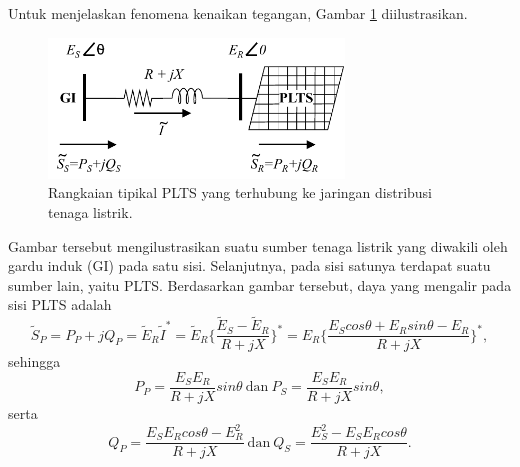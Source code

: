 {Untuk menjelaskan fenomena kenaikan tegangan, Gambar \ref{volrise} diilustrasikan. 
\begin{figure}[!h]
	\centering
	\includegraphics[width=0.7\textwidth]{Fig/volrise.pdf}
	\caption{Rangkaian tipikal PLTS yang terhubung ke jaringan distribusi tenaga listrik.}
	\label{volrise}
\end{figure}
Gambar tersebut mengilustrasikan suatu sumber tenaga listrik yang diwakili oleh gardu induk (GI) pada satu sisi. Selanjutnya, pada sisi satunya terdapat suatu sumber lain, yaitu PLTS. Berdasarkan gambar tersebut, daya yang mengalir pada sisi PLTS adalah
\begin{equation}\label{eq:volrise1}
	\widetilde S_P = P_P + jQ_P =
	\widetilde E_R \widetilde I^* =
	\widetilde E_R \Big\{\dfrac{\widetilde E_S - \widetilde E_R}{R+jX}\Big\}^* =
	E_R \Big\{\dfrac{E_S cos\theta + E_R sin\theta - E_R}{R+jX}\Big\}^*,
\end{equation}
sehingga
\begin{equation}\label{eq:volrise2}
	P_P = \dfrac{E_S E_R}{R+jX}sin\theta \ \text{dan}\  P_S = \dfrac{E_S E_R}{R+jX}sin\theta,
\end{equation}
serta
\begin{equation}\label{eq:volrise3}
	Q_P = \dfrac{E_S E_R cos\theta - E_R^2}{R+jX} \ \text{dan}\  Q_S = \dfrac{E_S^2 - E_S E_R cos\theta}{R+jX}.
\end{equation}

}
